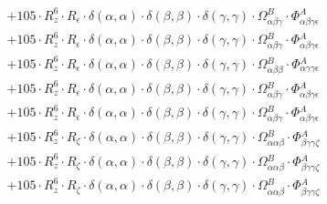 \documentclass{article}
\begin{document}
\begin{subequations}
\begin{gather}
\begin{array}{c}
 \\[0.2em] 		 + 105 \cdot R_{z}^{6} \cdot R_{\epsilon{}} \cdot \delta{}\left(\alpha{}, \alpha{}\right) \cdot \delta{}\left(\beta{}, \beta{}\right) \cdot \delta{}\left(\gamma{}, \gamma{}\right) \cdot \Omega{}^{B}_{\alpha{}\beta{}\gamma{}} \cdot \Phi{}^{A}_{\alpha{}\beta{}\gamma{}\epsilon{}} 
 \\[0.2em] 		 + 105 \cdot R_{z}^{6} \cdot R_{\epsilon{}} \cdot \delta{}\left(\alpha{}, \alpha{}\right) \cdot \delta{}\left(\beta{}, \beta{}\right) \cdot \delta{}\left(\gamma{}, \gamma{}\right) \cdot \Omega{}^{B}_{\alpha{}\beta{}\gamma{}} \cdot \Phi{}^{A}_{\alpha{}\beta{}\gamma{}\epsilon{}} 
 \\[0.2em] 		 + 105 \cdot R_{z}^{6} \cdot R_{\epsilon{}} \cdot \delta{}\left(\alpha{}, \alpha{}\right) \cdot \delta{}\left(\beta{}, \beta{}\right) \cdot \delta{}\left(\gamma{}, \gamma{}\right) \cdot \Omega{}^{B}_{\alpha{}\beta{}\beta{}} \cdot \Phi{}^{A}_{\alpha{}\gamma{}\gamma{}\epsilon{}} 
 \\[0.2em] 		 + 105 \cdot R_{z}^{6} \cdot R_{\epsilon{}} \cdot \delta{}\left(\alpha{}, \alpha{}\right) \cdot \delta{}\left(\beta{}, \beta{}\right) \cdot \delta{}\left(\gamma{}, \gamma{}\right) \cdot \Omega{}^{B}_{\alpha{}\beta{}\gamma{}} \cdot \Phi{}^{A}_{\alpha{}\beta{}\gamma{}\epsilon{}} 
 \\[0.2em] 		 + 105 \cdot R_{z}^{6} \cdot R_{\epsilon{}} \cdot \delta{}\left(\alpha{}, \alpha{}\right) \cdot \delta{}\left(\beta{}, \beta{}\right) \cdot \delta{}\left(\gamma{}, \gamma{}\right) \cdot \Omega{}^{B}_{\alpha{}\beta{}\gamma{}} \cdot \Phi{}^{A}_{\alpha{}\beta{}\gamma{}\epsilon{}} 
 \\[0.2em] 		 + 105 \cdot R_{z}^{6} \cdot R_{\zeta{}} \cdot \delta{}\left(\alpha{}, \alpha{}\right) \cdot \delta{}\left(\beta{}, \beta{}\right) \cdot \delta{}\left(\gamma{}, \gamma{}\right) \cdot \Omega{}^{B}_{\alpha{}\alpha{}\beta{}} \cdot \Phi{}^{A}_{\beta{}\gamma{}\gamma{}\zeta{}} 
 \\[0.2em] 		 + 105 \cdot R_{z}^{6} \cdot R_{\zeta{}} \cdot \delta{}\left(\alpha{}, \alpha{}\right) \cdot \delta{}\left(\beta{}, \beta{}\right) \cdot \delta{}\left(\gamma{}, \gamma{}\right) \cdot \Omega{}^{B}_{\alpha{}\alpha{}\beta{}} \cdot \Phi{}^{A}_{\beta{}\gamma{}\gamma{}\zeta{}} 
 \\[0.2em] 		 + 105 \cdot R_{z}^{6} \cdot R_{\zeta{}} \cdot \delta{}\left(\alpha{}, \alpha{}\right) \cdot \delta{}\left(\beta{}, \beta{}\right) \cdot \delta{}\left(\gamma{}, \gamma{}\right) \cdot \Omega{}^{B}_{\alpha{}\alpha{}\beta{}} \cdot \Phi{}^{A}_{\beta{}\gamma{}\gamma{}\zeta{}} 

\end{array}
\end{gather}
\end{subequations}
\end{document}
